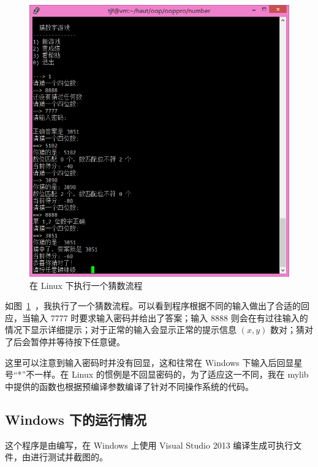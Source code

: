 \begin{figure}[htp]
\includegraphics[width=\textwidth]{image/tjf/guess.png}
\caption{\label{guess}在 Linux 下执行一个猜数流程}
\end{figure}

如图~\ref{guess}~，我执行了一个猜数流程。可以看到程序根据不同的输入做出了合适的回应，当输入 7777 时要求输入密码并给出了答案；输入 8888 则会在有过往输入的情况下显示详细提示；对于正常的输入会显示正常的提示信息 $(x,y)$ 数对；猜对了后会暂停并等待按下任意键。

这里可以注意到输入密码时并没有回显，这和往常在 Windows 下输入后回显星号“*”不一样。在 Linux 的惯例是不回显密码的，为了适应这一不同，我在 mylib 中提供的函数也根据预编译参数编译了针对不同操作系统的代码。

\subsection{Windows 下的运行情况}

这个程序是由\xzp 编写，在 Windows 上使用 Visual Studio 2013 编译生成可执行文件，由\wzh 进行测试并截图的。

